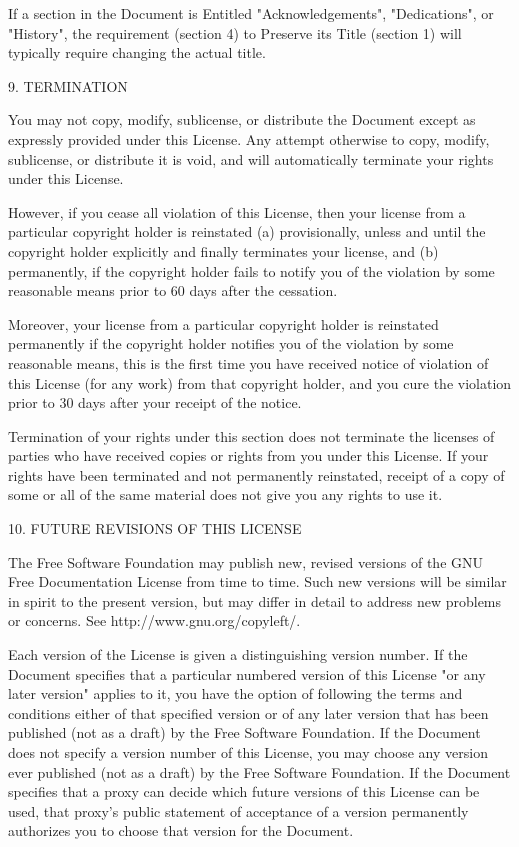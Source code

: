 \documentclass[11pt,a4paper]{article}
\begin{document}
\begin{scriptsize}
If a section in the Document is Entitled "Acknowledgements",
"Dedications", or "History", the requirement (section 4) to Preserve
its Title (section 1) will typically require changing the actual
title.


9. TERMINATION

You may not copy, modify, sublicense, or distribute the Document
except as expressly provided under this License.  Any attempt
otherwise to copy, modify, sublicense, or distribute it is void, and
will automatically terminate your rights under this License.

However, if you cease all violation of this License, then your license
from a particular copyright holder is reinstated (a) provisionally,
unless and until the copyright holder explicitly and finally
terminates your license, and (b) permanently, if the copyright holder
fails to notify you of the violation by some reasonable means prior to
60 days after the cessation.

Moreover, your license from a particular copyright holder is
reinstated permanently if the copyright holder notifies you of the
violation by some reasonable means, this is the first time you have
received notice of violation of this License (for any work) from that
copyright holder, and you cure the violation prior to 30 days after
your receipt of the notice.

Termination of your rights under this section does not terminate the
licenses of parties who have received copies or rights from you under
this License.  If your rights have been terminated and not permanently
reinstated, receipt of a copy of some or all of the same material does
not give you any rights to use it.


10. FUTURE REVISIONS OF THIS LICENSE

The Free Software Foundation may publish new, revised versions of the
GNU Free Documentation License from time to time.  Such new versions
will be similar in spirit to the present version, but may differ in
detail to address new problems or concerns.  See
http://www.gnu.org/copyleft/.

Each version of the License is given a distinguishing version number.
If the Document specifies that a particular numbered version of this
License "or any later version" applies to it, you have the option of
following the terms and conditions either of that specified version or
of any later version that has been published (not as a draft) by the
Free Software Foundation.  If the Document does not specify a version
number of this License, you may choose any version ever published (not
as a draft) by the Free Software Foundation.  If the Document
specifies that a proxy can decide which future versions of this
License can be used, that proxy's public statement of acceptance of a
version permanently authorizes you to choose that version for the
Document.


\end{scriptsize}
\end{document}
